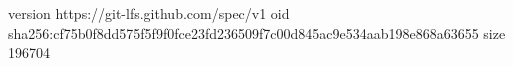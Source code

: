 version https://git-lfs.github.com/spec/v1
oid sha256:cf75b0f8dd575f5f9f0fce23fd236509f7c00d845ac9e534aab198e868a63655
size 196704
